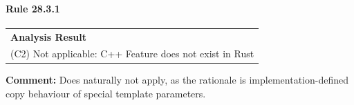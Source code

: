 \paragraph{Rule 28.3.1}
\begin{longtable}{p{13cm}}
\textbf{Analysis Result} \\
(C2) Not applicable: C++ Feature does not exist in Rust \\
\end{longtable}
\textbf{Comment:} Does naturally not apply, as the rationale is implementation-defined copy behaviour of special template parameters. \\
